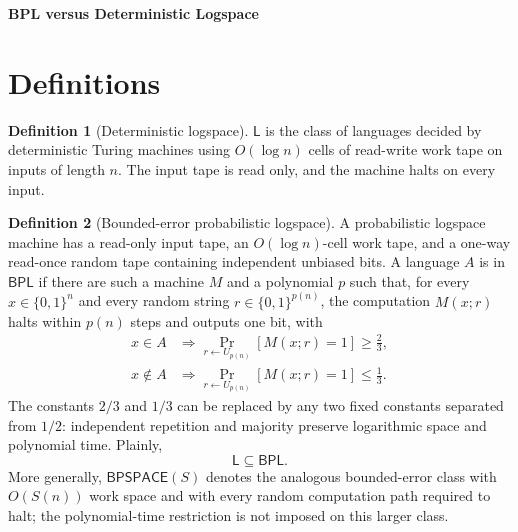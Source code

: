 \documentclass[10pt,a4paper]{article}
\theoremstyle{definition}
\newtheorem*{definition*}{Definition}
\newcommand{\Lclass}{\mathsf{L}}
\newcommand{\BPL}{\mathsf{BPL}}
\newcommand{\BPSPACE}{\mathsf{BPSPACE}}
\begin{document}
\begin{center}
  {\Large\bfseries BPL versus Deterministic Logspace}
\end{center}

\section{Definitions}

\begin{definition*}[Deterministic logspace]
$\Lclass$ is the class of languages decided by deterministic Turing machines
using $O(\log n)$ cells of read-write work tape on inputs of length $n$. The
input tape is read only, and the machine halts on every input.
\end{definition*}

\begin{definition*}[Bounded-error probabilistic logspace]
A probabilistic logspace machine has a read-only input tape, an $O(\log n)$-cell
work tape, and a one-way read-once random tape containing independent unbiased
bits. A language $A$ is in $\BPL$ if there are such a machine $M$ and a
polynomial $p$ such that, for every $x\in\{0,1\}^n$ and every random string
$r\in\{0,1\}^{p(n)}$, the computation $M(x;r)$ halts within $p(n)$ steps and
outputs one bit, with
\begin{align}
  x\in A
  &\Longrightarrow
  \Pr_{r\leftarrow U_{p(n)}}[M(x;r)=1]\geq\frac{2}{3},\\
  x\notin A
  &\Longrightarrow
  \Pr_{r\leftarrow U_{p(n)}}[M(x;r)=1]\leq\frac{1}{3}.
\end{align}
The constants $2/3$ and $1/3$ can be replaced by any two fixed constants
separated from $1/2$: independent repetition and majority preserve logarithmic
space and polynomial time. Plainly,
\begin{equation}
  \Lclass\subseteq\BPL.
\end{equation}
More generally, $\BPSPACE(S)$ denotes the analogous bounded-error class with
$O(S(n))$ work space and with every random computation path required to halt;
the polynomial-time restriction is not imposed on this larger class.
\end{definition*}
\end{document}
